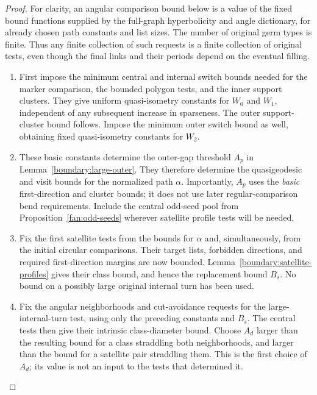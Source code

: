 \begin{proof}
For clarity, an angular comparison bound below is a value of the fixed
bound functions supplied by the full-graph hyperbolicity and angle
dictionary, for already chosen path constants and list sizes. The number
of original germ types is finite. Thus any finite collection of such
requests is a finite collection of original tests, even though the final
links and their periods depend on the eventual filling.

\begin{enumerate}[label=\textup{\arabic*.},leftmargin=*]
\item First impose the minimum central and internal switch bounds needed
for the marker comparison, the bounded polygon tests, and the inner
support clusters. They give uniform quasi-isometry constants for $W_0$
and $W_1$, independent of any subsequent increase in sparseness. The
outer support-cluster bound follows. Impose the minimum outer switch bound
as well, obtaining fixed quasi-isometry constants for $W_2$.

\item These basic constants determine the outer-gap threshold $A_p$ in
Lemma~\ref{boundary:large-outer}. They therefore determine the
quasigeodesic and visit bounds for the normalized path $\alpha$.
Importantly, $A_p$ uses the \emph{basic} first-direction and cluster
bounds; it does not use later regular-comparison bend requirements.
Include the central odd-seed pool from Proposition~\ref{fan:odd-seeds} wherever
satellite profile tests will be needed.

\item Fix the first satellite tests from the bounds for $\alpha$ and,
simultaneously, from the initial circular comparisons. Their target lists,
forbidden directions, and required first-direction margins are now
bounded. Lemma~\ref{boundary:satellite-profiles} gives their class bound,
and hence the replacement bound $B_s$. No bound on a possibly large
original internal turn has been used.

\item Fix the angular neighborhoods and cut-avoidance requests for the
large-internal-turn test, using only the preceding constants and $B_s$.
The central tests then give their intrinsic class-diameter bound. Choose
$A_d$ larger than the resulting bound for a class straddling both
neighborhoods, and larger than the bound for a satellite pair straddling
them. This is the first choice of $A_d$; its value is not an input to the
tests that determined it.


\end{enumerate}
\end{proof}
